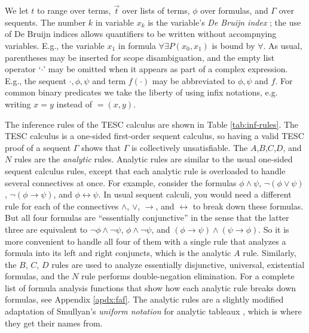 \documentclass[12pt]{article}
\newcommand{\limp}[0]{\to}
\newcommand{\liff}[0]{\leftrightarrow}
\begin{document}
We let $t$ to range over terms, $\vec{t}$ over lists of terms, $\phi$ over formulas, 
and $\Gamma$ over sequents. The number $k$ in variable $x_k$ is the variable's 
\textit{De Bruijn index} \cite{de1972lambda}; the use of De Bruijn indices allows 
quantifiers to be written without accompnying variables. E.g., the variable $x_1$ 
in formula $\forall \exists P(x_0,x_1)$ is bound by $\forall$. As usual, parentheses may be 
inserted for scope disambiguation, and the empty list operator `$\cdot$' may be omitted when 
it appears as part of a complex expression. E.g., the sequent $\cdot, \phi, \psi$ and term 
$f(\cdot)$ may be abbreviated to $\phi, \psi$ and $f$. For common binary predicates we take 
the liberty of using infix notations, e.g. writing $x = y$ instead of $=(x,y)$. 



The inference rules of the TESC calculus are shown in Table \ref{tab:inf-rules}.
The TESC calculus is a one-sided first-order sequent calculus, so having 
a valid TESC proof of a sequent $\Gamma$ shows that $\Gamma$ is collectively unsatisfiable.
The $A$,$B$,$C$,$D$, and $N$ rules are the \textit{analytic} rules. 
Analytic rules are similar to the usual one-sided sequent calculus rules, 
except that each analytic rule is overloaded to handle several connectives at once. 
For example, consider the formulas $\phi \land \psi$, $\lnot (\phi \lor \psi)$, 
$\lnot (\phi \limp \psi)$, and $\phi \liff \psi$. In usual sequent calculi, you would 
need a different rule for each of the connectives $\land$, $\lor$, $\limp$, and $\liff$ to 
break down these formulas. But all four formulas are ``essentially conjunctive'' 
in the sense that the latter three are equivalent to $\lnot \phi \land \lnot \psi$, 
$\phi \land \lnot \psi$, and $(\phi \limp \psi) \land (\psi \limp \phi)$.
So it is more convenient to handle all four of them with a single rule that analyzes 
a formula into its left and right conjuncts, which is the analytic $A$ rule.
Similarly, the $B$, $C$, $D$ rules are used to analyze essentially disjunctive, 
universal, existential formulas, and the $N$ rule performs double-negation elimination. 
For a complete list of formula analysis functions that show how each analytic 
rule breaks down formulas, see Appendix \ref{apdx:faf}. The analytic rules are 
a slightly modified adaptation of Smullyan's \textit{uniform notation} for analytic 
tableaux \cite{smullyan1995first}, which is where they get their names from. 
\end{document}
